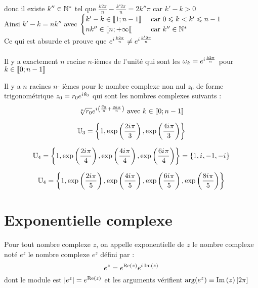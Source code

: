 \begin{dem}
    donc il existe \(k'' \in \mathbb{N}^*\) tel que \(\frac{k2\pi}{n} -\frac{k'2\pi}{n} = 2 k'' \pi\) car \(k'-k >0\)\\
    Ainsi \(k'-k = nk''\) avec \(\begin{cases}
        k'-k \in \left\llbracket1;n-1\right\rrbracket &\text{ car } 0\leqslant k<k'\leqslant n-1 \\
        nk'' \in \left\llbracket n;+\infty\right\llbracket & \text{ car } k''\in \mathbb{N}^*
    \end{cases}\) \\
    Ce qui est absurde et prouve que \(e^{i\mkern1mu \frac{k2\pi}{n}} \neq e^{i\mkern1mu \frac{k'2\pi}{n}}\)\\
    \conclusion \\
    Il y a exactement \(n\) racine \(n\)-ièmes de l'unité qui sont les \( \omega_k = e^{i\mkern1mu \frac{k2\pi}{n}}\) pour \(k\in \left\llbracket0;n-1\right\rrbracket\)
\end{dem}


\begin{defprop}
    Il y a \(n\) racines \(n\)- ièmes pour le nombre complexe non nul \(z_0\) de forme trigonométrique \(z_0 = r_0e^{i\mkern1mu\theta_0}\) qui sont les nombres complexes suivants :
    \[\sqrt[n]{r_0}e^{i\mkern1mu \left(\frac{\theta_0}{n}+\frac{2k\pi}{n}\right)} \text{ avec }k \in \left\llbracket0;n-1\right\rrbracket\]
\end{defprop}

\begin{ex}
\[\mathbb{U}_3 = \left\lbrace1,\exp\left(\frac{2i\mkern1mu \pi}{3}\right),\exp \left(\frac{4 i\mkern1mu \pi}{3}\right)\right\rbrace\]

\[\mathbb{U}_4 = \left\lbrace1,\exp\left(\frac{2i\mkern1mu \pi}{4}\right),\exp \left(\frac{4 i\mkern1mu \pi}{4}\right),\exp \left(\frac{6 i\mkern1mu \pi}{4}\right)\right\rbrace = \left\lbrace1,i\mkern1mu,-1,-i\mkern1mu\right\rbrace\]

\[\mathbb{U}_4 = \left\lbrace1,\exp\left(\frac{2i\mkern1mu \pi}{5}\right),\exp \left(\frac{4 i\mkern1mu \pi}{5}\right),\exp \left(\frac{6 i\mkern1mu \pi}{5}\right),\exp \left(\frac{8i\mkern1mu \pi}{5}\right)\right\rbrace \]

\end{ex}

\section{Exponentielle complexe}
\begin{defi}
Pour tout nombre complexe \(z\), on appelle exponentielle de \(z\) le nombre complexe noté \(e^z\) le nombre complexe \(e^z\) défini par : 
\[e^z = e^{\operatorname{Re}\left(z\right)}e^{i\mkern1mu \operatorname{Im}\left(z\right)}\]
dont le module est \(\left\lvert e^z\right\rvert = e^{\operatorname{Re}\left(z\right)}\) et les arguments vérifient \(\arg(e^z)\equiv \operatorname{Im}\left(z\right) [2\pi]\)
\end{defi}

